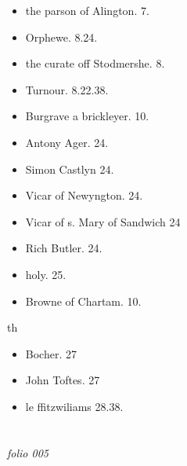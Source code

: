 \documentclass[12pt, a4paper]{book}
\begin{document}
				\begin{itemize}
					\item[]the parson of Alington. 7.
					\item[]Orphewe. 8.24.
					\item[]the curate off Stodmershe. 8.
					\item[]Turnour. 8.22.38.
					\item[]Burgrave a brickleyer. 10.
				\end{itemize}
				\begin{itemize}
					\item[]Antony Ager. 24.
					\item[]Simon Castlyn 24.
					\item[]Vicar of Newyngton. 24.
					\item[]Vicar of s. Mary of Sandwich 24
					\item[]Rich Butler. 24.
					\item[]holy. 25.
				\end{itemize}
			
            		
            			
				\marginpar[\vspace{0.5cm}{\textcolor{Gray}{n}}]{}
			
            			\begin{itemize}
            				\item[]Browne of Chartam. 10.
            			\end{itemize}
            			th
            			\begin{itemize}
            				\item[]Bocher. 27
            				\item[]John Toftes. 27
            				\item[]le ffitzwiliams 28.38.
            			\end{itemize}
            		

            	
\dotfill
						\newpage {} \section*{}  \subsection*{}

\textit{folio 005}
			
\end{document}
